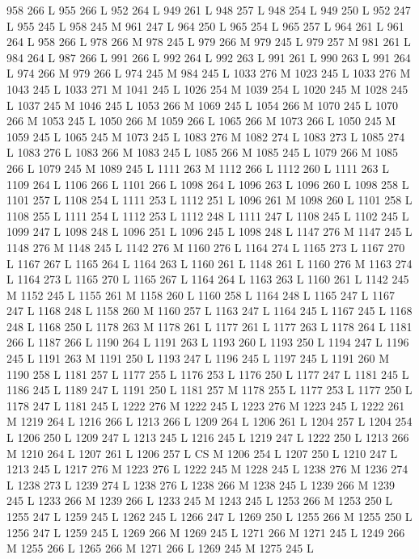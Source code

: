 {{{{{{{{{{{{{{{{{{{{{{{{958 266 L
955 266 L
952 264 L
949 261 L
948 257 L
948 254 L
949 250 L
952 247 L
955 245 L
958 245 M 961 247 L
964 250 L
965 254 L
965 257 L
964 261 L
961 264 L
958 266 L
978 266 M 978 245 L
979 266 M 979 245 L
979 257 M 981 261 L
984 264 L
987 266 L
991 266 L
992 264 L
992 263 L
991 261 L
990 263 L
991 264 L
974 266 M 979 266 L
974 245 M 984 245 L
1033 276 M 1023 245 L
1033 276 M 1043 245 L
1033 271 M 1041 245 L
1026 254 M 1039 254 L
1020 245 M 1028 245 L
1037 245 M 1046 245 L
1053 266 M 1069 245 L
1054 266 M 1070 245 L
1070 266 M 1053 245 L
1050 266 M 1059 266 L
1065 266 M 1073 266 L
1050 245 M 1059 245 L
1065 245 M 1073 245 L
1083 276 M 1082 274 L
1083 273 L
1085 274 L
1083 276 L
1083 266 M 1083 245 L
1085 266 M 1085 245 L
1079 266 M 1085 266 L
1079 245 M 1089 245 L
1111 263 M 1112 266 L
1112 260 L
1111 263 L
1109 264 L
1106 266 L
1101 266 L
1098 264 L
1096 263 L
1096 260 L
1098 258 L
1101 257 L
1108 254 L
1111 253 L
1112 251 L
1096 261 M 1098 260 L
1101 258 L
1108 255 L
1111 254 L
1112 253 L
1112 248 L
1111 247 L
1108 245 L
1102 245 L
1099 247 L
1098 248 L
1096 251 L
1096 245 L
1098 248 L
1147 276 M 1147 245 L
1148 276 M 1148 245 L
1142 276 M 1160 276 L
1164 274 L
1165 273 L
1167 270 L
1167 267 L
1165 264 L
1164 263 L
1160 261 L
1148 261 L
1160 276 M 1163 274 L
1164 273 L
1165 270 L
1165 267 L
1164 264 L
1163 263 L
1160 261 L
1142 245 M 1152 245 L
1155 261 M 1158 260 L
1160 258 L
1164 248 L
1165 247 L
1167 247 L
1168 248 L
1158 260 M 1160 257 L
1163 247 L
1164 245 L
1167 245 L
1168 248 L
1168 250 L
1178 263 M 1178 261 L
1177 261 L
1177 263 L
1178 264 L
1181 266 L
1187 266 L
1190 264 L
1191 263 L
1193 260 L
1193 250 L
1194 247 L
1196 245 L
1191 263 M 1191 250 L
1193 247 L
1196 245 L
1197 245 L
1191 260 M 1190 258 L
1181 257 L
1177 255 L
1176 253 L
1176 250 L
1177 247 L
1181 245 L
1186 245 L
1189 247 L
1191 250 L
1181 257 M 1178 255 L
1177 253 L
1177 250 L
1178 247 L
1181 245 L
1222 276 M 1222 245 L
1223 276 M 1223 245 L
1222 261 M 1219 264 L
1216 266 L
1213 266 L
1209 264 L
1206 261 L
1204 257 L
1204 254 L
1206 250 L
1209 247 L
1213 245 L
1216 245 L
1219 247 L
1222 250 L
1213 266 M 1210 264 L
1207 261 L
1206 257 L
CS M
1206 254 L
1207 250 L
1210 247 L
1213 245 L
1217 276 M 1223 276 L
1222 245 M 1228 245 L
1238 276 M 1236 274 L
1238 273 L
1239 274 L
1238 276 L
1238 266 M 1238 245 L
1239 266 M 1239 245 L
1233 266 M 1239 266 L
1233 245 M 1243 245 L
1253 266 M 1253 250 L
1255 247 L
1259 245 L
1262 245 L
1266 247 L
1269 250 L
1255 266 M 1255 250 L
1256 247 L
1259 245 L
1269 266 M 1269 245 L
1271 266 M 1271 245 L
1249 266 M 1255 266 L
1265 266 M 1271 266 L
1269 245 M 1275 245 L
}}}}}}}}}}}}}}}}}}}}}}}}
